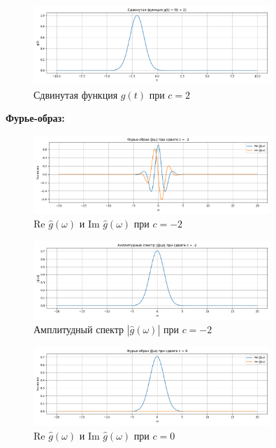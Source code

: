 \begin{figure}[H]
    \centering
    \includegraphics[width=0.8\textwidth]{g_function_c2.png}
    \caption{Сдвинутая функция $g(t)$ при $c = 2$}
\end{figure}

\textbf{Фурье-образ:}

\begin{figure}[H]
    \centering
    \includegraphics[width=0.8\textwidth]{g_hat_complex_c-2.png}
    \caption{Re $\hat{g}(\omega)$ и Im $\hat{g}(\omega)$ при $c = -2$}
\end{figure}

\begin{figure}[H]
    \centering
    \includegraphics[width=0.8\textwidth]{g_hat_magnitude_c-2.png}
    \caption{Амплитудный спектр $|\hat{g}(\omega)|$ при $c = -2$}
\end{figure}

\begin{figure}[H]
    \centering
    \includegraphics[width=0.8\textwidth]{g_hat_complex_c0.png}
    \caption{Re $\hat{g}(\omega)$ и Im $\hat{g}(\omega)$ при $c = 0$}
\end{figure}

